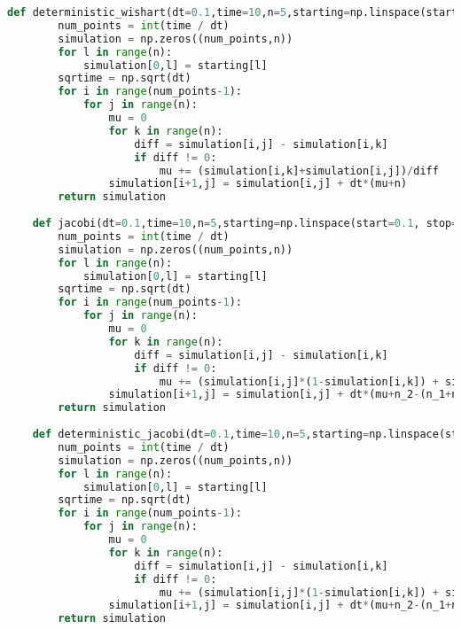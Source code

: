 \begin{lstlisting}[language=Python, caption=Euler-Maruyama algorithm for simulation of eigenvalue processes]
    def deterministic_wishart(dt=0.1,time=10,n=5,starting=np.linspace(start=0, stop=5, num=5)):
        num_points = int(time / dt)
        simulation = np.zeros((num_points,n))
        for l in range(n):
            simulation[0,l] = starting[l]
        sqrtime = np.sqrt(dt)
        for i in range(num_points-1):
            for j in range(n):
                mu = 0
                for k in range(n):
                    diff = simulation[i,j] - simulation[i,k]
                    if diff != 0:
                        mu += (simulation[i,k]+simulation[i,j])/diff
                simulation[i+1,j] = simulation[i,j] + dt*(mu+n)
        return simulation
    
    def jacobi(dt=0.1,time=10,n=5,starting=np.linspace(start=0.1, stop=0.9, num=5),n_1=5,n_2=5):
        num_points = int(time / dt)
        simulation = np.zeros((num_points,n))
        for l in range(n):
            simulation[0,l] = starting[l]
        sqrtime = np.sqrt(dt)
        for i in range(num_points-1):
            for j in range(n):
                mu = 0
                for k in range(n):
                    diff = simulation[i,j] - simulation[i,k]
                    if diff != 0:
                        mu += (simulation[i,j]*(1-simulation[i,k]) + simulation[i,k]*(1-simulation[i,j]))/diff
                simulation[i+1,j] = simulation[i,j] + dt*(mu+n_2-(n_1+n_2)*simulation[i,j]) + 1.5*sqrtime*np.random.randn()*np.sqrt(simulation[i,j]*(1-simulation[i,j]))
        return simulation
    
    def deterministic_jacobi(dt=0.1,time=10,n=5,starting=np.linspace(start=0.1, stop=0.9, num=5),n_1=5,n_2=5):
        num_points = int(time / dt)
        simulation = np.zeros((num_points,n))
        for l in range(n):
            simulation[0,l] = starting[l]
        sqrtime = np.sqrt(dt)
        for i in range(num_points-1):
            for j in range(n):
                mu = 0
                for k in range(n):
                    diff = simulation[i,j] - simulation[i,k]
                    if diff != 0:
                        mu += (simulation[i,j]*(1-simulation[i,k]) + simulation[i,k]*(1-simulation[i,j]))/diff
                simulation[i+1,j] = simulation[i,j] + dt*(mu+n_2-(n_1+n_2)*simulation[i,j]) 
        return simulation
\end{lstlisting}
